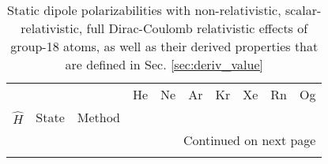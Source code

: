 \begin{longtable}{llllllllll}
\caption{Static dipole polarizabilities with non-relativistic, scalar-relativistic, full Dirac-Coulomb relativistic effects of group-18 atoms, as well as their derived properties that are defined in Sec. \ref{sec:deriv_value}}\label{tab:dipole_group_18}\\
\toprule
      &         &                                    &      He &      Ne &       Ar &              Kr &             Xe &          Rn &          Og \\
$\hat{H}$ & State & Method &         &         &          &                 &                &             &             \\
\midrule
\endhead
\midrule
\multicolumn{10}{r}{{Continued on next page}} \\
\midrule
\endfoot


\end{longtable}
